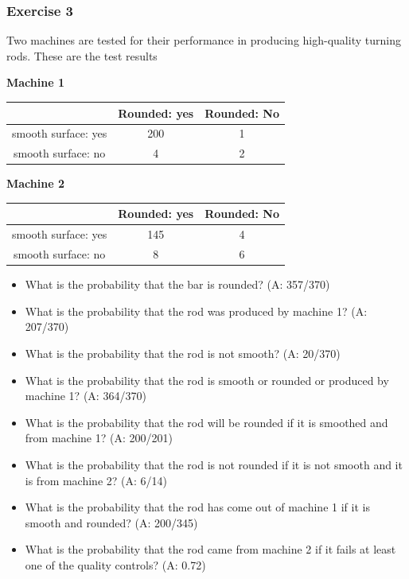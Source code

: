 \documentclass[
]{book}
\providecommand{\tightlist}{%
  \setlength{\itemsep}{0pt}\setlength{\parskip}{0pt}}
\begin{document}
\hypertarget{exercise-3-1}{%
\subsubsection{Exercise 3}\label{exercise-3-1}}

Two machines are tested for their performance in producing high-quality turning rods. These are the test results

\textbf{Machine 1}

\begin{longtable}[]{@{}ccc@{}}
\toprule\noalign{}
& Rounded: yes & Rounded: No \\
\midrule\noalign{}
\endhead
\bottomrule\noalign{}
\endlastfoot
smooth surface: yes & 200 & 1 \\
smooth surface: no & 4 & 2 \\
\end{longtable}

\textbf{Machine 2}

\begin{longtable}[]{@{}ccc@{}}
\toprule\noalign{}
& Rounded: yes & Rounded: No \\
\midrule\noalign{}
\endhead
\bottomrule\noalign{}
\endlastfoot
smooth surface: yes & 145 & 4 \\
smooth surface: no & 8 & 6 \\
\end{longtable}

\begin{itemize}
\tightlist
\item
  What is the probability that the bar is rounded? (A: 357/370)
\item
  What is the probability that the rod was produced by machine 1? (A: 207/370)
\item
  What is the probability that the rod is not smooth? (A: 20/370)
\item
  What is the probability that the rod is smooth or rounded or produced by machine 1? (A: 364/370)
\item
  What is the probability that the rod will be rounded if it is smoothed and from machine 1? (A: 200/201)
\item
  What is the probability that the rod is not rounded if it is not smooth and it is from machine 2? (A: 6/14)
\item
  What is the probability that the rod has come out of machine 1 if it is smooth and rounded? (A: 200/345)
\item
  What is the probability that the rod came from machine 2 if it fails at least one of the quality controls? (A: 0.72)
\end{itemize}
\end{document}
